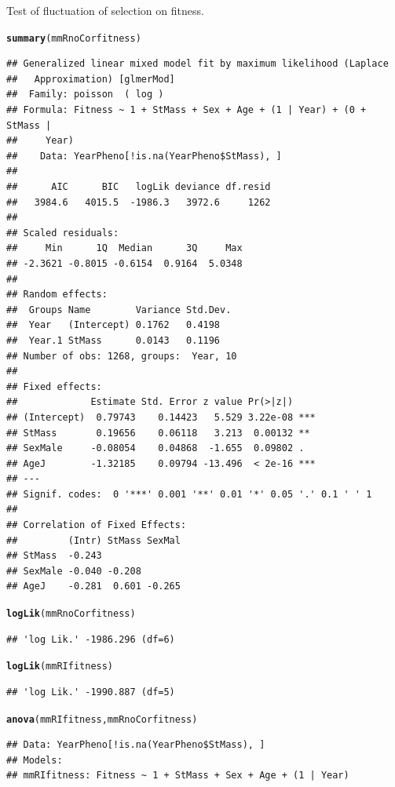 \documentclass{article}\usepackage[]{graphicx}\usepackage[]{color}
\makeatletter
\newcommand{\hlstd}[1]{\textcolor[rgb]{0.345,0.345,0.345}{#1}}%
\newcommand{\hlkwd}[1]{\textcolor[rgb]{0.737,0.353,0.396}{\textbf{#1}}}%
\newenvironment{kframe}{%
 \def\at@end@of@kframe{}%
 \ifinner\ifhmode%
  \def\at@end@of@kframe{\end{minipage}}%
  \begin{minipage}{\columnwidth}%
 \fi\fi%
 \def\FrameCommand##1{\hskip\@totalleftmargin \hskip-\fboxsep
 \colorbox{shadecolor}{##1}\hskip-\fboxsep
     \hskip-\linewidth \hskip-\@totalleftmargin \hskip\columnwidth}%
 \MakeFramed {\advance\hsize-\width
   \@totalleftmargin\z@ \linewidth\hsize
   \@setminipage}}%
 {\par\unskip\endMakeFramed%
 \at@end@of@kframe}
\newenvironment{knitrout}{}{} %
\makeatother
\begin{document}
Test of fluctuation of selection on fitness.
\begin{knitrout}
\color{fgcolor}\begin{kframe}
\begin{alltt}
\hlkwd{summary}\hlstd{(mmRnoCorfitness)}
\end{alltt}
\begin{verbatim}
## Generalized linear mixed model fit by maximum likelihood (Laplace
##   Approximation) [glmerMod]
##  Family: poisson  ( log )
## Formula: Fitness ~ 1 + StMass + Sex + Age + (1 | Year) + (0 + StMass |  
##     Year)
##    Data: YearPheno[!is.na(YearPheno$StMass), ]
## 
##      AIC      BIC   logLik deviance df.resid 
##   3984.6   4015.5  -1986.3   3972.6     1262 
## 
## Scaled residuals: 
##     Min      1Q  Median      3Q     Max 
## -2.3621 -0.8015 -0.6154  0.9164  5.0348 
## 
## Random effects:
##  Groups Name        Variance Std.Dev.
##  Year   (Intercept) 0.1762   0.4198  
##  Year.1 StMass      0.0143   0.1196  
## Number of obs: 1268, groups:  Year, 10
## 
## Fixed effects:
##             Estimate Std. Error z value Pr(>|z|)    
## (Intercept)  0.79743    0.14423   5.529 3.22e-08 ***
## StMass       0.19656    0.06118   3.213  0.00132 ** 
## SexMale     -0.08054    0.04868  -1.655  0.09802 .  
## AgeJ        -1.32185    0.09794 -13.496  < 2e-16 ***
## ---
## Signif. codes:  0 '***' 0.001 '**' 0.01 '*' 0.05 '.' 0.1 ' ' 1
## 
## Correlation of Fixed Effects:
##         (Intr) StMass SexMal
## StMass  -0.243              
## SexMale -0.040 -0.208       
## AgeJ    -0.281  0.601 -0.265
\end{verbatim}
\begin{alltt}
\hlkwd{logLik}\hlstd{(mmRnoCorfitness)}
\end{alltt}
\begin{verbatim}
## 'log Lik.' -1986.296 (df=6)
\end{verbatim}
\begin{alltt}
\hlkwd{logLik}\hlstd{(mmRIfitness)}
\end{alltt}
\begin{verbatim}
## 'log Lik.' -1990.887 (df=5)
\end{verbatim}
\begin{alltt}
\hlkwd{anova}\hlstd{(mmRIfitness,mmRnoCorfitness)}
\end{alltt}
\begin{verbatim}
## Data: YearPheno[!is.na(YearPheno$StMass), ]
## Models:
## mmRIfitness: Fitness ~ 1 + StMass + Sex + Age + (1 | Year)

\end{verbatim}
\end{kframe}
\end{knitrout}
\end{document}
